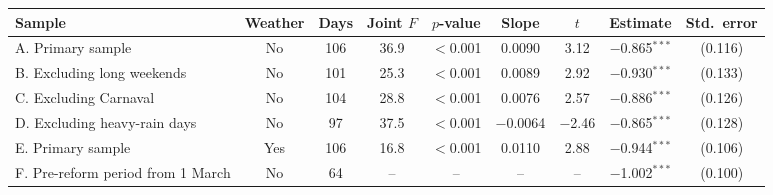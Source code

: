 \begin{tabular*}{\textwidth}{@{\extracolsep{\fill}}lcccccccc@{}}
\toprule
Sample & Weather & Days & Joint $F$ & $p$-value & Slope & $t$ & Estimate & Std.\ error \\
\midrule
A. Primary sample & No & 106 & 36.9 & $<$0.001 & 0.0090 & 3.12 & $-$0.865$^{***}$ & (0.116) \\
B. Excluding long weekends & No & 101 & 25.3 & $<$0.001 & 0.0089 & 2.92 & $-$0.930$^{***}$ & (0.133) \\
C. Excluding Carnaval & No & 104 & 28.8 & $<$0.001 & 0.0076 & 2.57 & $-$0.886$^{***}$ & (0.126) \\
D. Excluding heavy-rain days & No & 97 & 37.5 & $<$0.001 & $-$0.0064 & $-$2.46 & $-$0.865$^{***}$ & (0.128) \\
E. Primary sample & Yes & 106 & 16.8 & $<$0.001 & 0.0110 & 2.88 & $-$0.944$^{***}$ & (0.106) \\
F. Pre-reform period from 1 March & No & 64 & -- & -- & -- & -- & $-$1.002$^{***}$ & (0.100) \\
\bottomrule
\end{tabular*}
